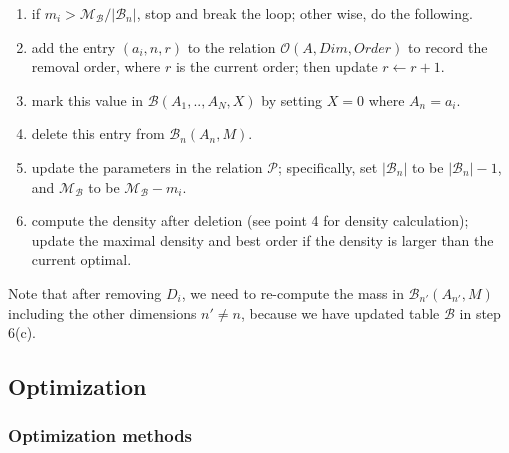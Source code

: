 \begin{enumerate}
\begin{enumerate}
\item if $m_i > \mathcal{M}_{\mathcal{B}} / {|\mathcal{B}_n|}$, stop and break the loop; other wise, do the following.
\item add the entry $(a_i, n, r)$ to the relation $\mathcal{O}(A, Dim, Order)$ to record the removal order, where $r$ is the current order; then update $r \leftarrow r+1$. 
\item mark this value in $\mathcal{B}(A_1, .., A_N, X)$ by setting $X=0$ where $A_n=a_i$.
\item delete this entry from $\mathcal{B}_n(A_n, M)$. 
\item update the parameters in the relation $\mathcal{P}$; specifically, set $|\mathcal{B}_n|$ to be $|\mathcal{B}_n|-1$, and $\mathcal{M}_{\mathcal{B}}$ to be $\mathcal{M}_{\mathcal{B}} - m_i$. 
\item compute the density after deletion (see point 4 for density calculation); update the maximal density and best order if the density is larger than the current optimal. 
\end{enumerate}
 
Note that after removing $D_i$, we need to re-compute the mass in $\mathcal{B}_{n'}(A_{n'}, M)$ including the other dimensions $n' \neq n$, because we have updated table $\mathcal{B}$ in step 6(c).


\end{enumerate}


\subsection{Optimization}

 \subsubsection{Optimization methods}
